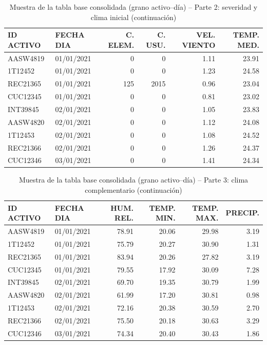 \begin{table}[H]
\centering
\small
\caption{Muestra de la tabla base consolidada (grano activo--día) -- Parte 2: severidad y clima inicial (continuación)}
\label{tab:muestra_consolidado_final_2}
\begin{tabular}{l l r r r r}
\toprule
\textbf{ID ACTIVO} & \textbf{FECHA DIA} & \textbf{C. ELEM.} & \textbf{C. USU.} & \textbf{VEL. VIENTO} & \textbf{TEMP. MED.} \\
\midrule
AASW4819 & 01/01/2021 & 0   & 0    & 1.11 & 23.91 \\
1T12452  & 01/01/2021 & 0   & 0    & 1.23 & 24.58 \\
REC21365 & 01/01/2021 & 125 & 2015 & 0.96 & 23.04 \\
CUC12345 & 01/01/2021 & 0   & 0    & 0.81 & 23.02 \\
INT39845 & 02/01/2021 & 0   & 0    & 1.05 & 23.83 \\
AASW4820 & 02/01/2021 & 0   & 0    & 1.12 & 24.08 \\
1T12453  & 02/01/2021 & 0   & 0    & 1.08 & 24.52 \\
REC21366 & 02/01/2021 & 0   & 0    & 1.26 & 24.37 \\
CUC12346 & 03/01/2021 & 0   & 0    & 1.41 & 24.34 \\
\bottomrule
\end{tabular}
\end{table}

\begin{table}[H]
\centering
\small
\caption{Muestra de la tabla base consolidada (grano activo--día) -- Parte 3: clima complementario (continuación)}
\label{tab:muestra_consolidado_final_3}
\begin{tabular}{l l r r r r}
\toprule
\textbf{ID ACTIVO} & \textbf{FECHA DIA} & \textbf{HUM. REL.} & \textbf{TEMP. MIN.} & \textbf{TEMP. MAX.} & \textbf{PRECIP.} \\
\midrule
AASW4819 & 01/01/2021 & 78.91 & 20.06 & 29.98 & 3.19 \\
1T12452  & 01/01/2021 & 75.79 & 20.27 & 30.90 & 1.31 \\
REC21365 & 01/01/2021 & 83.94 & 20.26 & 27.82 & 3.19 \\
CUC12345 & 01/01/2021 & 79.55 & 17.92 & 30.09 & 7.28 \\
INT39845 & 02/01/2021 & 69.70 & 19.35 & 30.79 & 1.99 \\
AASW4820 & 02/01/2021 & 61.99 & 17.20 & 30.81 & 0.98 \\
1T12453  & 02/01/2021 & 72.16 & 20.38 & 30.59 & 2.70 \\
REC21366 & 02/01/2021 & 75.50 & 20.18 & 30.63 & 3.29 \\
CUC12346 & 03/01/2021 & 74.34 & 20.40 & 30.43 & 1.86 \\
\bottomrule
\end{tabular}
\end{table}

